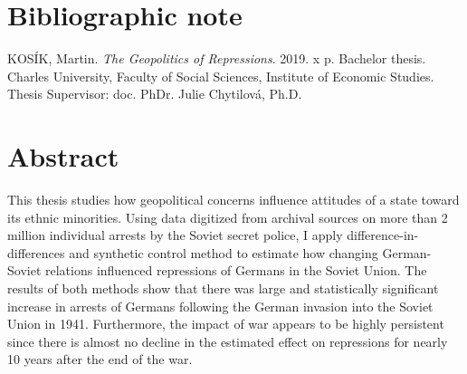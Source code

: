 \pagestyle{empty}

\section*{Bibliographic note}

\noindent KOSÍK, Martin. \textit{The Geopolitics of Repressions}.  2019. x p.
Bachelor thesis. Charles University, Faculty of Social Sciences, Institute of Economic Studies. Thesis Supervisor: doc. PhDr. Julie Chytilová, Ph.D. \\

\section*{Abstract}
  This thesis studies how geopolitical concerns influence attitudes of a state toward its ethnic minorities.
    Using  data digitized from archival sources on  more than 2 million individual arrests by the Soviet secret police, I apply difference-in-differences and synthetic control method to estimate how changing German-Soviet relations influenced repressions of Germans in the Soviet Union. 
   The results of both methods show that
   there was large and statistically significant increase in arrests of Germans following the German invasion into the Soviet Union in 1941.
   Furthermore, the impact of war  appears to be highly persistent since there is almost  no decline in the estimated effect on repressions for nearly 10 years after the end of the war.
   
   

